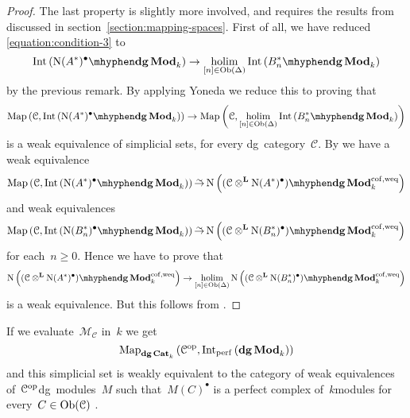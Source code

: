 \begin{refsection}
\begin{theorem}
\begin{proof}[Proof]
    The last property is slightly more involved, and requires the results from \cite{toen} discussed in section~\ref{section:mapping-spaces}. First of all, we have reduced \eqref{equation:condition-3} to
    \begin{equation}
      \Int\left( {\nerve(A^*)^\bullet}\mhyphen\dgMod_k \right)\to\holim_{[n]\in\Ob(\Delta)}\Int\left( {B_n^*}\mhyphen\dgMod_k \right)
    \end{equation}
    by the previous remark. By applying Yoneda we reduce this to proving that
    \begin{equation}
      \Map\left( \mathcal{C},\Int\left( {\nerve(A^*)^\bullet}\mhyphen\dgMod_k \right) \right)\to\Map\left( \mathcal{C},\holim_{[n]\in\Ob(\Delta)}\Int\left( {B_n^*}\mhyphen\dgMod_k \right) \right)
    \end{equation}
    is a weak equivalence of simplicial sets, for every dg~category~$\mathcal{C}$. By \cite[theorem 4.2]{toen} we have a weak equivalence
    \begin{equation}
      \Map\left( \mathcal{C},\Int\left( {\nerve(A^*)^\bullet}\mhyphen\dgMod_k \right) \right)\weq\nerve\left( {(\mathcal{C}\otimes^{\mathbf{L}}\nerve(A^*)^\bullet)}\mhyphen\dgMod_k^{\mathrm{cof,weq}} \right)
    \end{equation}
    and weak equivalences
    \begin{equation}
      \Map\left( \mathcal{C},\Int\left( {\nerve(B_n^*)^\bullet}\mhyphen\dgMod_k \right) \right)\weq\nerve\left( {(\mathcal{C}\otimes^{\mathbf{L}}\nerve(B_n^*)^\bullet)}\mhyphen\dgMod_k^{\mathrm{cof,weq}} \right)
    \end{equation}
    for each~$n\geq 0$. Hence we have to prove that
    \begin{equation}
      \nerve\left( {(\mathcal{C}\otimes^{\mathbf{L}}\nerve(A^*)^\bullet)}\mhyphen\dgMod_k^{\mathrm{cof,weq}} \right)\to\holim_{[n]\in\Ob(\Delta)}\nerve\left( {(\mathcal{C}\otimes^{\mathbf{L}}\nerve(B_n^*)^\bullet)}\mhyphen\dgMod_k^{\mathrm{cof,weq}} \right)
    \end{equation}
    is a weak equivalence. But this follows from \cite[corollary B.0.8]{hagII}.
  \end{proof}
\end{theorem}

\begin{example}
  If we evaluate~$\mathcal{M}_{\mathcal{C}}$ in~$k$ we get
  \begin{equation}
    \Map_{\dgCat_k}\left( \mathcal{C}^\opp,\Int_\perf\left( \dgMod_k \right) \right)
  \end{equation}
  and this simplicial set is weakly equivalent to the category of weak equivalences of~$\mathcal{C}^{\mathrm{op}}$\dash dg~modules~$M$ such that~$M(C)^\bullet$ is a perfect complex of~$k$\dash modules for every~$C\in\operatorname{Ob}(\mathcal{C})$ \cite[corollary 7.6]{toen}.
\end{example}



\end{refsection}
